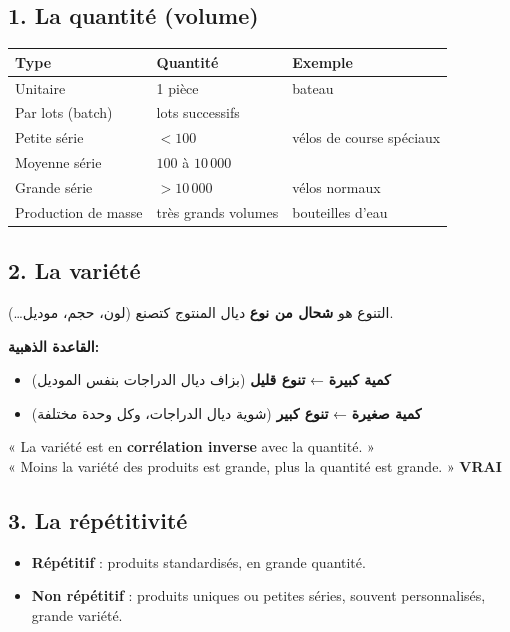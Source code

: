 \documentclass[11pt,a4paper]{article}
\newcommand{\vrai}{\textcolor{vert}{\textbf{VRAI}}}
\begin{document}
\subsection*{1. La quantité (volume)}
\begin{center}
\begin{tabular}{lll}
\toprule
\textbf{Type} & \textbf{Quantité} & \textbf{Exemple} \\
\midrule
Unitaire & 1 pièce & bateau \\
Par lots (batch) & lots successifs & \\
Petite série & $< 100$ & vélos de course spéciaux \\
Moyenne série & $100$ à $10\,000$ & \\
Grande série & $> 10\,000$ & vélos normaux \\
Production de masse & très grands volumes & bouteilles d'eau \\
\bottomrule
\end{tabular}
\end{center}

\subsection*{2. La variété}
\par\begin{Arabic}
التنوع هو \textbf{شحال من نوع} ديال المنتوج كتصنع (لون، حجم، موديل…).

\textbf{القاعدة الذهبية:}
\begin{itemize}
\item \textbf{كمية كبيرة} ← \textbf{تنوع قليل} (بزاف ديال الدراجات بنفس الموديل)
\item \textbf{كمية صغيرة} ← \textbf{تنوع كبير} (شوية ديال الدراجات، وكل وحدة مختلفة)
\end{itemize}
\end{Arabic}
\begin{examen}
« La variété est en \textbf{corrélation inverse} avec la quantité. »\\
« Moins la variété des produits est grande, plus la quantité est grande. » \vrai
\end{examen}

\subsection*{3. La répétitivité}
\begin{itemize}
\item \textbf{Répétitif} : produits standardisés, en grande quantité.
\item \textbf{Non répétitif} : produits uniques ou petites séries, souvent personnalisés, grande variété.
\end{itemize}
\end{document}
